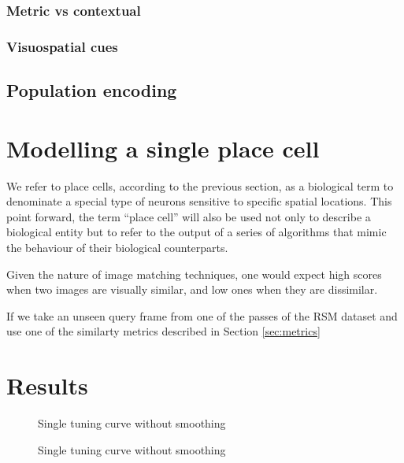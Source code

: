 \subsubsection{Metric vs contextual}

\subsubsection{Visuospatial cues}

\subsection{Population encoding}

\section{Modelling a single place cell}

We refer to place cells, according to the previous section, as a biological term to denominate a special type of neurons sensitive to specific spatial locations. This point forward, the term ``place cell'' will also be used not only to describe a biological entity but to refer to the output of a series of algorithms that mimic the behaviour of their biological counterparts.

Given the nature of image matching techniques, one would expect high scores when two images are visually similar, and low ones when they are dissimilar. 


If we take an unseen query frame from one of the passes of the RSM dataset and use one of the similarty metrics described in Section \ref{sec:metrics}


\section{Results}

\begin{figure}
	\centering
	\setlength{}
	\setlength{}
		
	\caption{Single tuning curve without smoothing}
\end{figure}

\begin{figure}
	\centering
	\setlength{}
	\setlength{}
		
	\caption{Single tuning curve without smoothing}
\end{figure}

